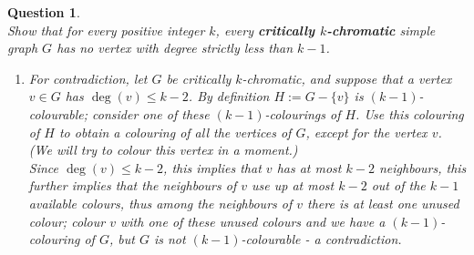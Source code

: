 \documentclass[twoside]{article}
\theoremstyle{mystyle}
\newtheorem{quest}{Question}
\begin{document}
\begin{quest}\mbox{}\\

\noindent Show that for every positive integer $k$, every \textbf{critically $k$-chromatic} simple graph $G$ has no vertex with degree strictly less than $k-1$.\\

\begin{enumerate}
\item[{\bfseries Solution:}]
For contradiction, let $G$ be critically $k$-chromatic, and suppose that a vertex $v \in G$ has $\deg(v) \le k -2$. By definition $H := G - \{v\}$ is $(k-1)$-colourable; consider one of these $(k-1)$-colourings of $H$. Use this colouring of $H$ to obtain a colouring of all the vertices of $G$, \emph{except} for the vertex $v$. (We will try to colour this vertex in a moment.) \\

Since $\deg(v) \le k-2$, this implies that $v$ has at most $k-2$ neighbours, this further implies that the neighbours of $v$ use up \emph{at most} $k-2$ out of the $k-1$ available colours, thus among the neighbours of $v$ there is at least one unused colour; colour $v$ with one of these unused colours and we have a $(k-1)$-colouring of $G$, but $G$ is not $(k-1)$-colourable - a contradiction.

\end{enumerate}
\end{quest}

\end{document}
